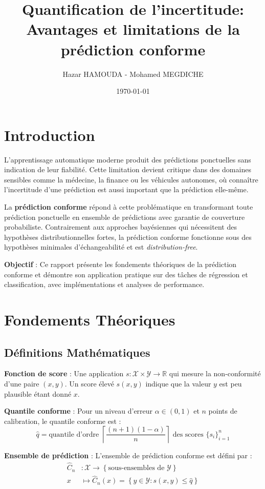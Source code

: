 \documentclass[a4paper,12pt]{article}
\title{\textbf{Quantification de l'incertitude:\\ Avantages et limitations de la prédiction conforme}}
\author{Hazar HAMOUDA - Mohamed MEGDICHE}
\date{\today}
\begin{document}
\maketitle

\section{Introduction}

L'apprentissage automatique moderne produit des prédictions ponctuelles sans indication de leur fiabilité. Cette limitation devient critique dans des domaines sensibles comme la médecine, la finance ou les véhicules autonomes, où connaître l'incertitude d'une prédiction est aussi important que la prédiction elle-même.

La \textbf{prédiction conforme} répond à cette problématique en transformant toute prédiction ponctuelle en ensemble de prédictions avec garantie de couverture probabiliste. Contrairement aux approches bayésiennes qui nécessitent des hypothèses distributionnelles fortes, la prédiction conforme fonctionne sous des hypothèses minimales d'échangeabilité et est \textit{distribution-free}.

\textbf{Objectif} : Ce rapport présente les fondements théoriques de la prédiction conforme et démontre son application pratique sur des tâches de régression et classification, avec implémentations et analyses de performance.

\section{Fondements Théoriques}

\subsection{Définitions Mathématiques}

\textbf{Fonction de score} : Une application $s : \mathcal{X} \times \mathcal{Y} \rightarrow \mathbb{R}$ qui mesure la non-conformité d'une paire $(x, y)$. Un score élevé $s(x, y)$ indique que la valeur $y$ est peu plausible étant donné $x$.

\textbf{Quantile conforme} : Pour un niveau d'erreur $\alpha \in (0,1)$ et $n$ points de calibration, le quantile conforme est :
$$\hat{q} = \text{quantile d'ordre } \left\lceil \frac{(n+1)(1 - \alpha)}{n} \right\rceil \text{ des scores } \{s_i\}_{i=1}^n$$

\textbf{Ensemble de prédiction} : L'ensemble de prédiction conforme est défini par :
\[
\begin{aligned}
\hat{C}_n &: \mathcal{X} \rightarrow \left\{ \text{sous-ensembles de } \mathcal{Y} \right\} \\
   x &\mapsto \hat{C}_n(x) = \left\{ y \in \mathcal{Y} : s(x, y) \leq \hat{q} \right\}
\end{aligned}
\]
\end{document}
